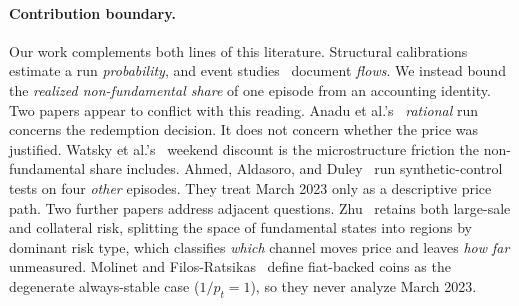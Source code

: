 \paragraph{Contribution boundary.} Our work complements both lines of this literature. Structural
calibrations~\cite{mzz2025} estimate a run \emph{probability}, and event
studies~\cite{anadu2024} document \emph{flows}. We instead bound the \emph{realized
non-fundamental share} of one episode from an accounting identity. Two papers appear to conflict with this reading. Anadu et al.'s~\cite{anadu2024} \emph{rational} run concerns the
redemption decision. It does not concern whether the price was justified. Watsky et
al.'s~\cite{watsky2024} weekend discount is the microstructure friction the non-fundamental
share includes. Ahmed, Aldasoro, and Duley~\cite{ahmedaldasoroduley2024} run
synthetic-control tests on four \emph{other} episodes. They treat March 2023 only as a descriptive price path. Two further papers
address adjacent questions. Zhu~\cite{zhu2026redemptions} retains both large-sale and
collateral risk, splitting the space of fundamental states into regions by dominant risk
type, which classifies \emph{which} channel moves price and leaves \emph{how far}
unmeasured. Molinet and Filos-Ratsikas~\cite{molinetfilos2026} define fiat-backed coins as
the degenerate always-stable case ($1/p_t=1$), so they never analyze March 2023.

